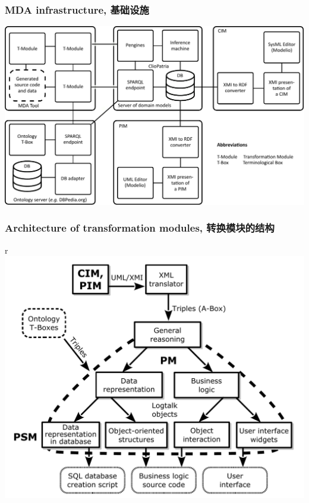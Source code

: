 \documentclass[10pt]{beamer}
\begin{document}
\begin{frame}
  \frametitle{MDA infrastructure,  基础设施}
  \centering
  \includegraphics[width=1\linewidth]{architecture-mda-lod-ext.pdf}
\end{frame}

\begin{frame}
  \frametitle{Architecture of transformation modules, 转换模块的结构}
  \centering
r  \includegraphics[width=0.9\linewidth]{architect_tree_pres-en-wo-OCL.pdf}
\end{frame}
\end{document}
